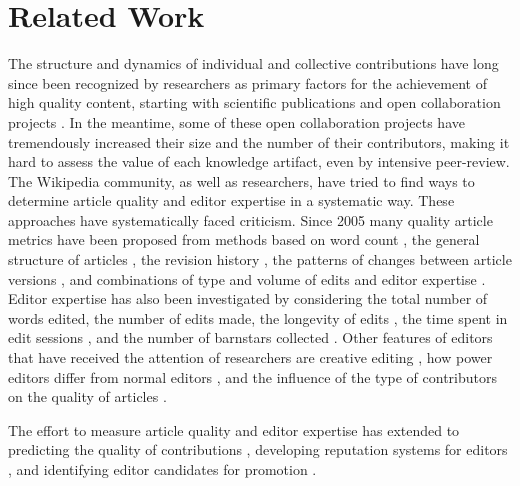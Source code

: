 \section{Related Work}
The structure and dynamics of individual and collective contributions have long since been recognized by researchers as primary factors for the achievement of high quality content, starting with scientific publications \cite{newman2001} and open collaboration projects \cite{bryant2005}. In the meantime, some of these open collaboration projects have tremendously increased their size and the number of their contributors, making it hard to assess the value of each knowledge artifact, even by intensive peer-review. The Wikipedia community, as well as researchers, have tried to find ways to determine article quality and editor expertise in a systematic way. These approaches have systematically faced criticism. Since 2005 many quality article metrics have been proposed from methods based on word count \cite{blumenstock2008sizematters}, the general structure of articles \cite{wang2013tell}, the revision history \cite{hu2007articlequality}, the patterns of changes between article versions \cite{woehner2009}, and combinations of type and volume of edits and editor expertise \cite{kane2011}. Editor expertise has also been investigated by considering the total number of words edited, the number of edits made, the longevity of edits \cite{adler2008measuringauthor}, the time spent in edit sessions \cite{geiger2013}, and the number of barnstars collected \cite{Kriplean2008}. Other features of editors that have received the attention of researchers are creative editing \cite{iba2010}, how power editors differ from normal editors \cite{panciera2009}, and the influence of the type of contributors on the quality of articles \cite{stein2007}.

The effort to measure article quality and editor expertise has extended to predicting the quality of contributions \cite{druck2008learning,zeng2006computingtrust}, developing reputation systems for editors \cite{adler2007contentdriven}, and identifying editor candidates for promotion \cite{burke2008taking}.


